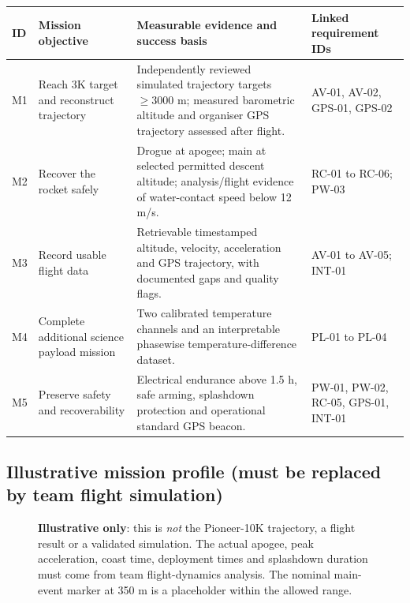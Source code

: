\small
\begin{tabularx}{\linewidth}{@{}L{11mm}L{41mm}Y L{39mm}@{}}
\toprule{}\textbf{ID}&\textbf{Mission objective}&\textbf{Measurable evidence and success basis}&\textbf{Linked requirement IDs}\\\midrule
M1 & Reach 3K target and reconstruct trajectory & Independently reviewed simulated trajectory targets $\ge3000$ m; measured barometric altitude and organiser GPS trajectory assessed after flight. & AV-01, AV-02, GPS-01, GPS-02\\
M2 & Recover the rocket safely & Drogue at apogee; main at selected permitted descent altitude; analysis/flight evidence of water-contact speed below 12 m/s. & RC-01 to RC-06; PW-03\\
M3 & Record usable flight data & Retrievable timestamped altitude, velocity, acceleration and GPS trajectory, with documented gaps and quality flags. & AV-01 to AV-05; INT-01\\
M4 & Complete additional science payload mission & Two calibrated temperature channels and an interpretable phasewise temperature-difference dataset. & PL-01 to PL-04\\
M5 & Preserve safety and recoverability & Electrical endurance above 1.5 h, safe arming, splashdown protection and operational standard GPS beacon. & PW-01, PW-02, RC-05, GPS-01, INT-01\\\bottomrule
\end{tabularx}
\normalsize

\subsection*{Illustrative mission profile (must be replaced by team flight simulation)}
\begin{figure}[htbp]\centering
{}
\caption{\textbf{Illustrative only}: this is \emph{not} the Pioneer-10K trajectory, a flight result or a validated simulation. The actual apogee, peak acceleration, coast time, deployment times and splashdown duration must come from team flight-dynamics analysis. The nominal main-event marker at 350 m is a placeholder within the allowed range.}
\label{fig:missionprofile}
\end{figure}

